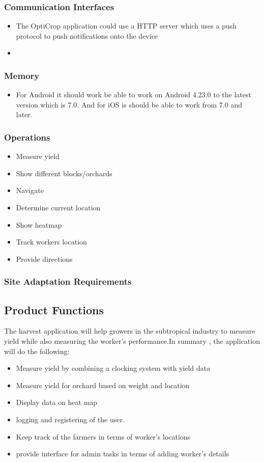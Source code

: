 \documentclass[runningheads,a4paper]{article}
\begin{document}
\subsubsection{Communication Interfaces}
\begin{itemize}
	\item 	The OptiCrop application could use a HTTP server which uses a push protocol to push notifications onto the device
	\item 
	
\end{itemize}
\subsubsection{Memory}
\begin{itemize}
	\item For Android  it should work be able to work on Android 4.23.0 to the latest version which is 7.0. And for iOS is should be able to work from 7.0 and later.
	
\end{itemize}
\subsubsection{Operations}
\begin{itemize}
	\item Measure yield
	\item Show different blocks/orchards
	\item Navigate
	\item	Determine current location
	\item	Show heatmap
	\item	Track workers location
	\item	Provide directions
	
\end{itemize}
\subsubsection{Site Adaptation Requirements}

	\subsection{Product Functions}
		The harvest application will help growers in the 
		subtropical industry to measure yield while also measuring the worker's 
		performance.In summary , the application will do the following:
			\begin{itemize}
			\item Measure yield by combining a clocking system
			with yield data
			\item Measure yield for orchard based on weight and location
			\item Display data on heat map
			\item logging and registering of the user.
			\item Keep track of the farmers in terms of worker's locations
			\item provide interface for admin tasks in terms of
			adding worker's details
			
		\end{itemize}
\end{document}
